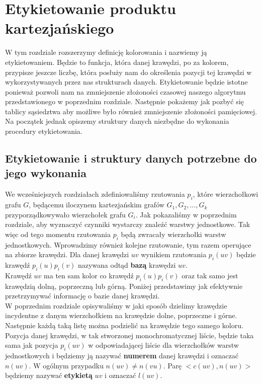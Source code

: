 \documentclass[12pt,a4paper,titlepage]{article}
\newcommand\tab[1][1cm]{\hspace*{#1}}
\begin{document}
\section{Etykietowanie produktu kartezjańskiego}
W tym rozdziale rozszerzymy definicję kolorowania i nazwiemy ją etykietowaniem. Będzie to funkcja, która danej krawędzi, po za kolorem, przypisze jeszcze liczbę, która posłuży nam do określenia pozycji tej krawędzi w wykorzystywanych przez nas strukturach danych. Etykietowanie będzie istotne ponieważ pozwoli nam na zmniejszenie złożoności czasowej naszego algorytmu przedstawionego w poprzednim rozdziale. Następnie pokażemy jak pozbyć się tablicy sąsiedztwa aby możliwe było również zmniejszenie złożoności pamięciowej. Na początek jednak opiszemy struktury danych niezbędne do wykonania procedury etykietowania.
\subsection{Etykietowanie i struktury danych potrzebne do jego wykonania}
\tab[0.6cm]We wcześniejszych rozdziałach zdefiniowaliśmy rzutowania $p_i$, które wierzchołkowi grafu $G$, będącemu iloczynem kartezjańskim grafów $G_1, G_2, ..., G_k$ przyporządkowywało wierzchołek grafu $G_i$. Jak pokazaliśmy w poprzednim rozdziale, aby wyznaczyć czynniki wystarczy znaleźć warstwy jednostkowe. Tak więc od tego momentu rzutowania $p_i$ będą zwracały wierzchołki warstw jednostkowych. Wprowadzimy również kolejne rzutowanie, tym razem operujące na zbiorze krawędzi. Dla danej krawędzi $uv$ wynikiem rzutowania $p_i(uv)$ będzie krawędź $p_i(u)p_i(v)$ nazywana odtąd \textbf{bazą} krawędzi $uv$. \\
\tab[0.6cm]Krawędź $uv$ ma ten sam kolor co krawędź $p_i (u)p_i(v)$ oraz tak samo jest krawędzią dolną, poprzeczną lub górną. Poniżej przedstawimy jak efektywnie przetrzymywać informację o bazie danej krawędzi.\\
\tab[0.6cm]W poprzednim rozdziale opisywaliśmy w jaki sposób dzielimy krawędzie incydentne z danym wierzchołkiem na krawędzie dolne, poprzeczne i górne. Następnie każdą taką listę można podzielić na krawędzie tego samego koloru. Pozycja danej krawędzi, w tak stworzonej monochromatycznej liście, będzie taka sama jak pozycja $p_i(uv)$ w odpowiadającej liście dla wierzchołków warstw jednostkowych i będziemy ją nazywać \textbf{numerem} danej krawędzi i oznaczać $n(uv)$. W ogólnym przypadku $n(uv) \neq n(vu)$. Parę $<c(uv), n(uv)>$ będziemy nazywać \textbf{etykietą} $uv$ i oznaczać $l(uv)$. \\
\end{document}
